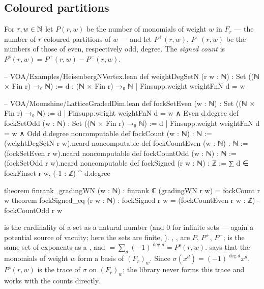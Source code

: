\subsection{Coloured partitions}

\begin{definition}\label{ch04:def:fockcount}
For $r,w\in{\mathbb{N}}$ let $P(r,w)$ be the number of monomials of weight $w$ in $F_r$ --- the number of
$r$-coloured partitions of $w$ --- and let $P^+(r,w)$, $P^-(r,w)$ be the numbers of those of even,
respectively odd, degree. The \emph{signed count} is $P^{\mathrm{s}}(r,w)=P^+(r,w)-P^-(r,w)$.
\end{definition}

\begin{leancode}
-- VOA/Examples/HeisenbergNVertex.lean
def weightDegSetN (r w : ℕ) : Set ((ℕ × Fin r) →₀ ℕ) :=
  {d : (ℕ × Fin r) →₀ ℕ | Finsupp.weight weightFnN d = w}

-- VOA/Moonshine/LatticeGradedDim.lean
def fockSetEven (w : ℕ) : Set ((ℕ × Fin r) →₀ ℕ) :=
  {d | Finsupp.weight weightFnN d = w ∧ Even d.degree}
def fockSetOdd (w : ℕ) : Set ((ℕ × Fin r) →₀ ℕ) :=
  {d | Finsupp.weight weightFnN d = w ∧ Odd d.degree}
noncomputable def fockCount (w : ℕ) : ℕ := (weightDegSetN r w).ncard
noncomputable def fockCountEven (w : ℕ) : ℕ := (fockSetEven r w).ncard
noncomputable def fockCountOdd (w : ℕ) : ℕ := (fockSetOdd r w).ncard
noncomputable def fockSigned (r w : ℕ) : ℤ := ∑ d ∈ fockFinset r w, (-1 : ℤ) ^ d.degree

theorem finrank_gradingWN (w : ℕ) : finrank ℂ (gradingWN r w) = fockCount r w
theorem fockSigned_eq (r w : ℕ) :
    fockSigned r w = (fockCountEven r w : ℤ) - fockCountOdd r w
\end{leancode}

\begin{dictionary}
 is the cardinality of a set as a natural number (and $0$ for infinite sets ---
again a potential source of vacuity; here the sets are finite, ).
, ,  are $P$, $P^+$, $P^-$;
 is the same set of exponents as a , and
 $=\sum_d(-1)^{\deg d}=P^{\mathrm s}(r,w)$.  says that
the monomials of weight $w$ form a basis of $(F_r)_w$. Since $\sigma(x^d)=(-1)^{\deg d}x^d$,
$P^{\mathrm s}(r,w)$ is the trace of $\sigma$ on $(F_r)_w$; the library never forms this trace and
works with the counts directly.
\end{dictionary}

